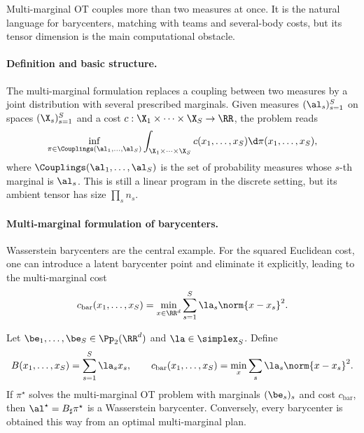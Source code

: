 Multi-marginal OT couples more than two measures at once. It is the natural language for barycenters, matching with teams and several-body costs, but its tensor dimension is the main computational obstacle.

\paragraph{Definition and basic structure.}

The multi-marginal formulation replaces a coupling between two measures by a joint distribution with several prescribed marginals. Given measures $(\al_s)_{s=1}^S$ on spaces $(\X_s)_{s=1}^S$ and a cost $c:\X_1\times\cdots\times\X_S\to\RR$, the problem reads
\[
	\inf_{\pi\in\Couplings(\al_1,\ldots,\al_S)}
	\int_{\X_1\times\cdots\times\X_S}
	c(x_1,\ldots,x_S)\d\pi(x_1,\ldots,x_S),
\]
where $\Couplings(\al_1,\ldots,\al_S)$ is the set of probability measures whose $s$-th marginal is $\al_s$. This is still a linear program in the discrete setting, but its ambient tensor has size $\prod_s n_s$.

\paragraph{Multi-marginal formulation of barycenters.}

Wasserstein barycenters are the central example. For the squared Euclidean cost, one can introduce a latent barycenter point and eliminate it explicitly, leading to the multi-marginal cost
\[
	c_{\mathrm{bar}}(x_1,\ldots,x_S)
	=
	\min_{x\in\RR^d}
	\sum_{s=1}^S\la_s\norm{x-x_s}^2.
\]

\begin{prop}\label{prop-multimarginal-barycenter}
	Let $\be_1,\ldots,\be_S\in\Pp_2(\RR^d)$ and $\la\in\simplex_S$. Define
	\[
		B(x_1,\ldots,x_S)=\sum_{s=1}^S\la_s x_s,
		\qquad
		c_{\mathrm{bar}}(x_1,\ldots,x_S)=\min_x\sum_s\la_s\norm{x-x_s}^2.
	\]
	If $\pi^\star$ solves the multi-marginal OT problem with marginals $(\be_s)_s$ and cost $c_{\mathrm{bar}}$, then $\al^\star=B_\sharp\pi^\star$ is a Wasserstein barycenter. Conversely, every barycenter is obtained this way from an optimal multi-marginal plan.
\end{prop}

